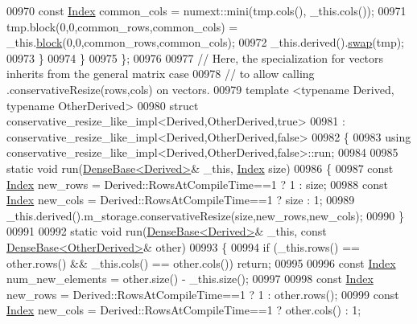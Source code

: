 \begin{DoxyCode}
00970       \textcolor{keyword}{const} \hyperlink{namespace_eigen_a62e77e0933482dafde8fe197d9a2cfde}{Index} common\_cols = numext::mini(tmp.cols(), \_this.cols());
00971       tmp.block(0,0,common\_rows,common\_cols) = \_this.\hyperlink{group___core___module_ab8e42e67c5cfd5fa13e684642f0f65bf}{block}(0,0,common\_rows,common\_cols);
00972       \_this.derived().\hyperlink{group___core___module_ab420d9d588ac443f5a1b1a7dceb12c90}{swap}(tmp);
00973     \}
00974   \}
00975 \};
00976 
00977 \textcolor{comment}{// Here, the specialization for vectors inherits from the general matrix case}
00978 \textcolor{comment}{// to allow calling .conservativeResize(rows,cols) on vectors.}
00979 \textcolor{keyword}{template} <\textcolor{keyword}{typename} Derived, \textcolor{keyword}{typename} OtherDerived>
00980 \textcolor{keyword}{struct }conservative\_resize\_like\_impl<Derived,OtherDerived,true>
00981   : conservative\_resize\_like\_impl<Derived,OtherDerived,false>
00982 \{
00983   \textcolor{keyword}{using} conservative\_resize\_like\_impl<Derived,OtherDerived,false>::run;
00984   
00985   \textcolor{keyword}{static} \textcolor{keywordtype}{void} run(\hyperlink{group___core___module_class_eigen_1_1_dense_base}{DenseBase<Derived>}& \_this, \hyperlink{namespace_eigen_a62e77e0933482dafde8fe197d9a2cfde}{Index} size)
00986   \{
00987     \textcolor{keyword}{const} \hyperlink{namespace_eigen_a62e77e0933482dafde8fe197d9a2cfde}{Index} new\_rows = Derived::RowsAtCompileTime==1 ? 1 : size;
00988     \textcolor{keyword}{const} \hyperlink{namespace_eigen_a62e77e0933482dafde8fe197d9a2cfde}{Index} new\_cols = Derived::RowsAtCompileTime==1 ? size : 1;
00989     \_this.derived().m\_storage.conservativeResize(size,new\_rows,new\_cols);
00990   \}
00991 
00992   \textcolor{keyword}{static} \textcolor{keywordtype}{void} run(\hyperlink{group___core___module_class_eigen_1_1_dense_base}{DenseBase<Derived>}& \_this, \textcolor{keyword}{const} 
      \hyperlink{group___core___module_class_eigen_1_1_dense_base}{DenseBase<OtherDerived>}& other)
00993   \{
00994     \textcolor{keywordflow}{if} (\_this.rows() == other.rows() && \_this.cols() == other.cols()) \textcolor{keywordflow}{return};
00995 
00996     \textcolor{keyword}{const} \hyperlink{namespace_eigen_a62e77e0933482dafde8fe197d9a2cfde}{Index} num\_new\_elements = other.size() - \_this.size();
00997 
00998     \textcolor{keyword}{const} \hyperlink{namespace_eigen_a62e77e0933482dafde8fe197d9a2cfde}{Index} new\_rows = Derived::RowsAtCompileTime==1 ? 1 : other.rows();
00999     \textcolor{keyword}{const} \hyperlink{namespace_eigen_a62e77e0933482dafde8fe197d9a2cfde}{Index} new\_cols = Derived::RowsAtCompileTime==1 ? other.cols() : 1;

\end{DoxyCode}
